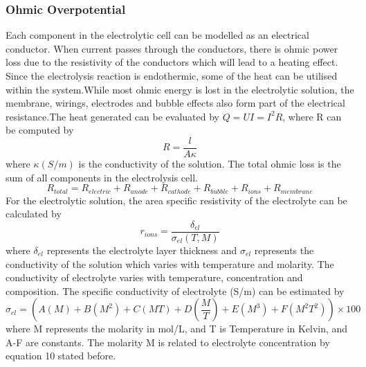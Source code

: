 \subsubsection{Ohmic Overpotential} 
Each component in the electrolytic cell can be modelled as an electrical conductor. When current passes through the conductors, there is ohmic power loss due to the resistivity of the conductors which will lead to a heating effect. Since the electrolysis reaction is endothermic, some of the heat can be utilised within the system.While most ohmic energy is lost in the electrolytic solution, the membrane, wirings, electrodes  and bubble effects also form part of the electrical resistance.The heat generated can be evaluated by  $ Q=UI=I^2 R$, where R can be computed by
 \begin{equation}
R=\frac{l} {A \kappa} 
\end{equation} 
where $ \kappa(S/m) $  is the conductivity of the solution.\newline
The total ohmic loss is the sum of all components in the electrolysis cell.
\begin{equation} 
R_{total}=R_{electric} + R_{anode}+ R_{cathode}+R_{bubble}+R_{ions} +R_{membrane} 
\end{equation} 
For the electrolytic solution, the area specific resistivity of the electrolyte can be calculated by
\begin{equation} 
r_{ions}=\frac{\delta_{el}} {\sigma_{el}(T,M) } 
\end{equation} 
where $\delta_{el}$ represents the electrolyte layer thickness and $\sigma_{el}$ represents the conductivity of the solution which varies with temperature and molarity.
The conductivity of electrolyte varies with temperature, concentration and composition. The specific conductivity of electrolyte (S/m) can be estimated by
\begin{equation} 
\sigma_{el} = (A(M) + B(M^2) + C(MT) + D(\frac{M} {T}) + E(M^3) +F(M^2T^2) )\times 100
\label{eq:sig}
\end{equation} 
where M represents the molarity in mol/L, and T is Temperature in Kelvin, and A-F are constants.\cite{conductivity}  The molarity M is related to electrolyte concentration by equation 10 stated before. 
